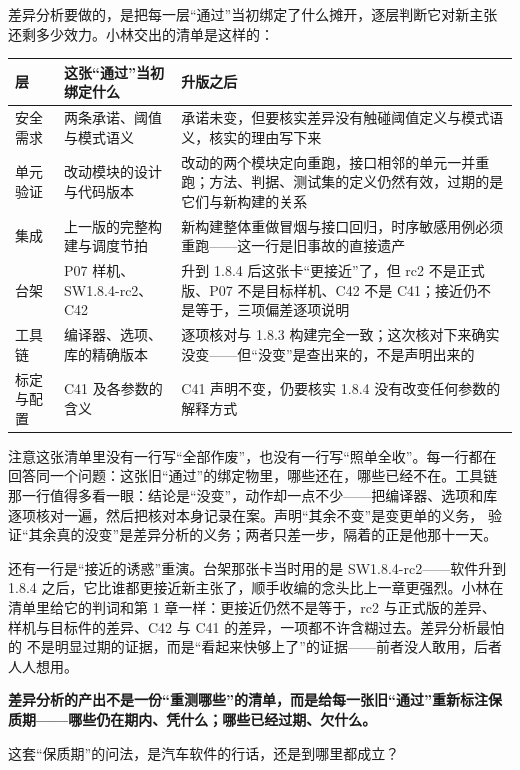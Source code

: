 差异分析要做的，是把每一层“通过”当初绑定了什么摊开，逐层判断它对新主张
还剩多少效力。小林交出的清单是这样的：

\begin{center}
\begingroup\small
\setlength{\tabcolsep}{4pt}
\begin{tabularx}{\linewidth}{@{}XXX@{}}
\toprule
层 & 这张“通过”当初绑定什么 & 升版之后 \\
\midrule
安全需求 & 两条承诺、阈值与模式语义 & 承诺未变，但要核实差异没有触碰阈值定义与模式语义，核实的理由写下来 \\
单元验证 & 改动模块的设计与代码版本 & 改动的两个模块定向重跑，接口相邻的单元一并重跑；方法、判据、测试集的定义仍然有效，过期的是它们与新构建的关系 \\
集成 & 上一版的完整构建与调度节拍 & 新构建整体重做冒烟与接口回归，时序敏感用例必须重跑——这一行是旧事故的直接遗产 \\
台架 & P07 样机、SW1.8.4-rc2、C42 & 升到 1.8.4 后这张卡“更接近”了，但 rc2 不是正式版、P07 不是目标样机、C42 不是 C41；接近仍不是等于，三项偏差逐项说明 \\
工具链 & 编译器、选项、库的精确版本 & 逐项核对与 1.8.3 构建完全一致；这次核对下来确实没变——但“没变”是查出来的，不是声明出来的 \\
标定与配置 & C41 及各参数的含义 & C41 声明不变，仍要核实 1.8.4 没有改变任何参数的解释方式 \\
\bottomrule
\end{tabularx}
\endgroup
\end{center}

注意这张清单里没有一行写“全部作废”，也没有一行写“照单全收”。每一行都在
回答同一个问题：这张旧“通过”的绑定物里，哪些还在，哪些已经不在。工具链
那一行值得多看一眼：结论是“没变”，动作却一点不少——把编译器、选项和库
逐项核对一遍，然后把核对本身记录在案。声明“其余不变”是变更单的义务，
验证“其余真的没变”是差异分析的义务；两者只差一步，隔着的正是他那十一天。

还有一行是“接近的诱惑”重演。台架那张卡当时用的是 SW1.8.4-rc2——软件升到
1.8.4 之后，它比谁都更接近新主张了，顺手收编的念头比上一章更强烈。小林在
清单里给它的判词和第 1 章一样：更接近仍然不是等于，rc2 与正式版的差异、
样机与目标件的差异、C42 与 C41 的差异，一项都不许含糊过去。差异分析最怕的
不是明显过期的证据，而是“看起来快够上了”的证据——前者没人敢用，后者
人人想用。

\textbf{差异分析的产出不是一份“重测哪些”的清单，而是给每一张旧“通过”重新标注保质期——哪些仍在期内、凭什么；哪些已经过期、欠什么。}

这套“保质期”的问法，是汽车软件的行话，还是到哪里都成立？

